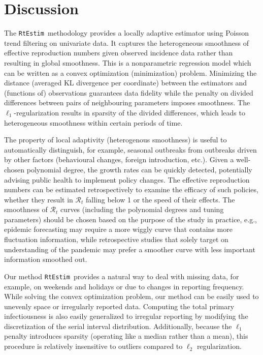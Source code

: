 \documentclass[10pt,letterpaper]{article}
\def\RtEstim{\texttt{RtEstim}}
\def\calR{\mathcal{R}}
\begin{document}
\section{Discussion}

The \RtEstim\ methodology provides a locally adaptive estimator using Poisson
trend filtering on univariate data. It captures the heterogeneous smoothness of
effective reproduction numbers given observed incidence data rather than
resulting in global smoothness. This is a nonparametric regression model which
can be written as a convex optimization (minimization) problem. Minimizing the
distance (averaged KL divergence per coordinate) between the estimators and
(functions of) observations guarantees data fidelity while the penalty on divided
differences between pairs of neighbouring parameters imposes smoothness. The
$\ell_1$-regularization results in sparsity of the divided differences, which
leads to heterogeneous smoothness within certain periods of time. 


The property of local adaptivity (heterogenous smoothness) is useful to
automatically distinguish, for example, seasonal outbreaks from outbreaks driven
by other factors (behavioural changes, foreign introduction, etc.). Given a
well-chosen polynomial degree, the growth rates can be quickly detected, 
potentially advising public health to implement policy changes. The effective
reproduction numbers can be estimated retrospectively to examine the efficacy of
such policies, whether they result in $\calR_t$ falling below 1 or the speed of
their effects. The smoothness of $\calR_t$ curves (including the polynomial 
degrees and tuning parameters) should be chosen based on the purpose of the 
study in practice, e.g., epidemic forecasting may require a more wiggly curve 
that contains more fluctuation information, while retrospective studies that 
solely target on understanding of the pandemic may prefer a smoother curve 
with less important information smoothed out. 


Our method \RtEstim\ provides a natural way to deal with missing data, for
example, on weekends and holidays or due to changes in reporting frequency.
While solving the convex optimization problem, our method can be easily 
used to unevenly space or irregularly reported data. Computing the total
primary infectiousness is also easily generalized to irregular reporting by
modifying the discretization of the serial interval distribution. Additionally,
because the $\ell_1$ penalty introduces sparsity (operating like a median
rather than a mean), this procedure is relatively insensitive to outliers
compared to $\ell_2$ regularization.
\end{document}

